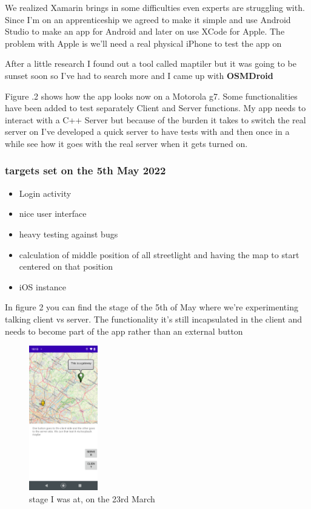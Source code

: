 \documentclass[a4paper,12pt]{article}
\begin{document}
\noindent We realized Xamarin brings in some difficulties even experts are struggling with. Since I'm on an apprenticeship we agreed to make it simple and use Android Studio to make an app for Android and later on use XCode for Apple. The problem with Apple is we'll need a real physical iPhone to test the app on

After a little research I found out a tool called maptiler but it was going to be sunset soon so I've had to search more and I came up with \textbf{OSMDroid}

Figure .2 shows how the app looks now on a Motorola g7. Some functionalities have been added to test separately Client and Server functions. My app needs to interact with a C++ Server but because of the burden it takes to switch the real server on I've developed a quick server to have tests with and then once in a while see how it goes with the real server when it gets turned on.

\subsubsection{targets set on the 5th May 2022}

\begin{itemize}
\item{Login activity}
\item{nice user interface}
\item{heavy testing against bugs}
\item{calculation of middle position of all streetlight and having the map to start centered on that position}
\item{iOS instance}
\end{itemize}

\clearpage

In figure 2 you can find the stage of the 5th of May where we're experimenting talking client vs server. The functionality it's still incapsulated in the client and needs to become part of the app rather than an external button
\begin{figure}
\centering
\includegraphics[width=3cm]{./current_status_g7.PNG}
\caption{stage I was at, on the 23rd March}\label{wrap-fig:2}
\end{figure}
\end{document}
